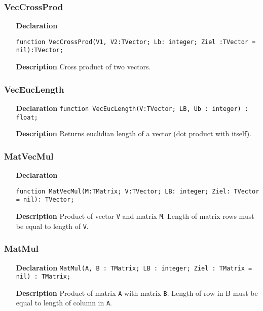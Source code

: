 \documentclass[12pt,a4paper,oneside]{report}
\newcommand{\declarationitem}[1]{\textbf{#1}}
\newcommand{\descriptiontitle}[1]{\textbf{#1}}
\newcommand{\code}[1]{\texttt{#1}}
\begin{document}
\subsubsection{VecCrossProd}
\label{VecCrossProd}
\begin{itemize}
\item[\declarationitem{Declaration}\hfill]\begin{flushleft}\code{function VecCrossProd(V1, V2:TVector; Lb: integer; Ziel :TVector = nil):TVector;}
\end{flushleft}
\item[\descriptiontitle{Description}] Cross product of two vectors.
\end{itemize}
\subsubsection{VecEucLength}
\label{VecEucLength}
\begin{itemize}
\item[\declarationitem{Declaration}\hfill]\code{function VecEucLength(V:TVector; LB, Ub : integer) : float;}
\item[\descriptiontitle{Description}]Returns euclidian length of a vector (dot product with itself).
\end{itemize}
\subsubsection{MatVecMul}
\label{MatVecMul}
\begin{itemize}
	\item[\declarationitem{Declaration}\hfill]
	\begin{flushleft}
	\code{function MatVecMul(M:TMatrix; V:TVector; LB: integer; Ziel: TVector = nil): TVector;}
	\end{flushleft}
	\item[\descriptiontitle{Description}]Product of vector \code{V} and matrix \code{M}. Length of matrix rows must be equal to length of \code{V}.
\end{itemize}
\subsubsection{MatMul}
\label{MatMul}
\begin{itemize}
\item[\declarationitem{Declaration}\hfill]
\code{MatMul(A, B : TMatrix; LB : integer; Ziel : TMatrix = nil) : TMatrix;}
\item[\descriptiontitle{Description}] Product of matrix \code{A} with matrix \code{B}. Length of row in B must be equal to length of column in \code{A}.
\end{itemize}
\end{document}
